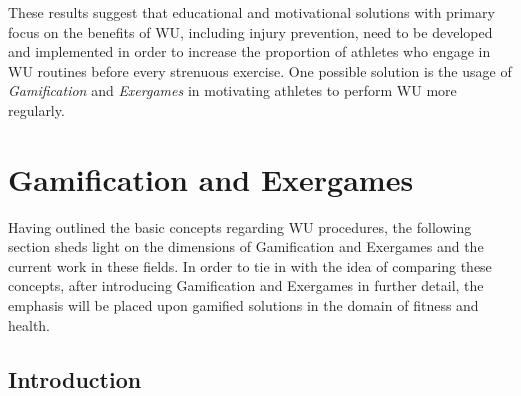 These results suggest that educational and motivational solutions with primary focus on the benefits of WU, including injury prevention, need to be developed and implemented in order to increase the proportion of athletes who engage in WU routines before every strenuous exercise. One possible solution is the usage of \textit{Gamification} and \textit{Exergames} in motivating athletes to perform WU more regularly. 
\pagebreak
\section{Gamification and Exergames}
Having outlined the basic concepts regarding WU procedures, the following section sheds light 
on the dimensions of Gamification and Exergames and the current work in these fields. In order to tie in with the idea of comparing these concepts, after introducing Gamification and Exergames in further detail, the emphasis will be placed upon gamified solutions in the domain of fitness and health. 
\subsection{Introduction}
